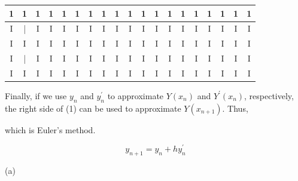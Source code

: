 \documentclass[10pt]{article}
\begin{document}
\begin{center}
\begin{tabular}{|c|c|c|c|c|c|c|c|c|c|c|c|c|c|c|c|c|c|c|}
\hline
1 & 1 & 1 & 1 & 1 & 1 & 1 & 1 & 1 & 1 & 1 & 1 & 1 & 1 & 1 & 1 & 1 & 1 & 1 \\
\hline
I & | & I & I & I & I & I & I & I & I & I & I & I & I & I & I & I & I & I \\
\hline
I & I & I & I & I & I & I & I & I & I & I & I & I & I & I & I & I & I & I \\
\hline
I & | & I & I & I & I & I & I & I & I & I & I & I & I & I & I & I & I & I \\
\hline
I & I & I & I & I & I & I & I & I & I & I & I & I & I & I & I & I & I & I \\
\hline
\end{tabular}
\end{center}

Finally, if we use $y_{n}$ and $y_{n}^{\prime}$ to approximate $Y\left(x_{n}\right)$ and $Y^{\prime}\left(x_{n}\right)$, respectively, the right side of (1) can be used to approximate $Y\left(x_{n+1}\right)$. Thus,

which is Euler's method.

$$
y_{n+1}=y_{n}+h y_{n}^{\prime}
$$

(a)
\end{document}
